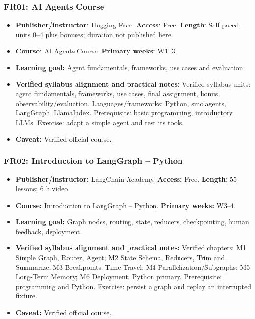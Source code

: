 \documentclass[
  10pt,
]{article}
\providecommand{\tightlist}{%
  \setlength{\itemsep}{0pt}\setlength{\parskip}{0pt}}
\begin{document}
\subsubsection{FR01: AI Agents Course}\label{fr01-ai-agents-course}

\begin{itemize}
\tightlist
\item
  \textbf{Publisher/instructor:} Hugging Face. \textbf{Access:} Free.
  \textbf{Length:} Self-paced; units 0--4 plus bonuses; duration not
  published here.
\item
  \textbf{Course:}
  \href{https://huggingface.co/learn/agents-course/unit0/introduction}{AI
  Agents Course}. \textbf{Primary weeks:} W1--3.
\item
  \textbf{Learning goal:} Agent fundamentals, frameworks, use cases and
  evaluation.
\item
  {\raggedright \textbf{Verified syllabus alignment and practical notes:} Verified
  syllabus units: agent fundamentals, frameworks, use cases, final
  assignment, bonus observability/\allowbreak evaluation. Languages/\allowbreak frameworks:
  Python, smolagents, LangGraph, LlamaIndex. Prerequisite: basic
  programming, introductory LLMs. Exercise: adapt a simple agent and
  test its tools.\par}
\item
  \textbf{Caveat:} Verified official course.
\end{itemize}

\subsubsection{FR02: Introduction to LangGraph --
Python}\label{fr02-introduction-to-langgraph-python}

\begin{itemize}
\tightlist
\item
  \textbf{Publisher/instructor:} LangChain Academy. \textbf{Access:}
  Free. \textbf{Length:} 55 lessons; 6 h video.
\item
  \textbf{Course:}
  \href{https://academy.langchain.com/courses/intro-to-langgraph}{Introduction
  to LangGraph -- Python}. \textbf{Primary weeks:} W3--4.
\item
  \textbf{Learning goal:} Graph nodes, routing, state, reducers,
  checkpointing, human feedback, deployment.
\item
  {\raggedright \textbf{Verified syllabus alignment and practical notes:} Verified
  chapters: M1 Simple Graph, Router, Agent; M2 State Schema, Reducers,
  Trim and Summarize; M3 Breakpoints, Time Travel; M4
  Parallelization/\allowbreak Subgraphs; M5 Long-Term Memory; M6 Deployment. Python
  primary. Prerequisite: programming and Python. Exercise: persist a
  graph and replay an interrupted fixture.\par}
\item
  \textbf{Caveat:} Verified official course.
\end{itemize}
\end{document}
